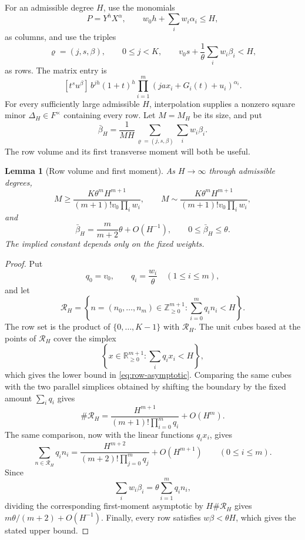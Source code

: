 \documentclass[11pt]{article}
\newcommand{\RR}{\mathbb R}
\newcommand{\NN}{\mathbb Z_{\ge 0}}
\newtheorem{lemma}[theorem]{Lemma}
\theoremstyle{definition}
\theoremstyle{remark}
\numberwithin{equation}{section}
\begin{document}
For an admissible degree $H$, use the monomials
\[
 P=Y^hX^\alpha,
 \qquad w_0h+\sum_iw_i\alpha_i\le H,
\]
as columns, and use the triples
\[
 \varrho=(j,s,\beta),\qquad
 0\le j<K,
 \qquad v_0s+\frac1\theta\sum_iw_i\beta_i<H,
\]
as rows.  The matrix entry is
\begin{equation}\label{eq:matrix-entry}
 [t^su^\beta]\,
 b^{jh}(1+t)^h
 \prod_{i=1}^m(ja x_i+G_i(t)+u_i)^{\alpha_i}.
\end{equation}
For every sufficiently large admissible $H$, interpolation supplies a
nonzero square minor $\Delta_H\in F^\times$ containing every row.  Let
$M=M_H$ be its size, and put
\begin{equation}\label{eq:bbar}
 \bar\beta_H=\frac1{MH}
 \sum_{\varrho=(j,s,\beta)}\sum_iw_i\beta_i.
\end{equation}
The row volume and its first transverse moment will both be useful.

\begin{lemma}[Row volume and first moment]\label{lem:row-moment}
As $H\to\infty$ through admissible degrees,
\begin{equation}\label{eq:row-asymptotic}
 M\ge
 \frac{K\theta^mH^{m+1}}
 {(m+1)!v_0\prod_iw_i},
 \qquad
 M\sim
 \frac{K\theta^mH^{m+1}}
 {(m+1)!v_0\prod_iw_i},
\end{equation}
and
\begin{equation}\label{eq:row-first-moment}
 \bar\beta_H=\frac{m}{m+2}\theta+O(H^{-1}),
 \qquad 0\le\bar\beta_H\le\theta.
\end{equation}
The implied constant depends only on the fixed weights.
\end{lemma}

\begin{proof}
Put
\[
 q_0=v_0,
 \qquad q_i=\frac{w_i}{\theta}\quad(1\le i\le m),
\]
and let
\[
 \mathcal R_H=
 \left\{n=(n_0,\ldots,n_m)\in\NN^{m+1}:
       \sum_{i=0}^m q_i n_i<H\right\}.
\]
The row set is the product of $\{0,\ldots,K-1\}$ with
$\mathcal R_H$.  The unit cubes based at the points of $\mathcal R_H$
cover the simplex
\[
 \left\{x\in\RR_{\ge0}^{m+1}:\sum_iq_ix_i<H\right\},
\]
which gives the lower bound in \eqref{eq:row-asymptotic}.  Comparing the
same cubes with the two parallel simplices obtained by shifting the
boundary by the fixed amount $\sum_iq_i$ gives
\[
 \#\mathcal R_H
 =\frac{H^{m+1}}{(m+1)!\prod_{i=0}^m q_i}+O(H^m).
\]
The same comparison, now with the linear functions $q_i x_i$, gives
\[
 \sum_{n\in\mathcal R_H}q_i n_i
 =\frac{H^{m+2}}{(m+2)!\prod_{j=0}^m q_j}+O(H^{m+1})
 \qquad(0\le i\le m).
\]
Since
\[
 \sum_iw_i\beta_i
 =\theta\sum_{i=1}^m q_i n_i,
\]
dividing the corresponding first-moment asymptotic by
$H\#\mathcal R_H$ gives
$m\theta/(m+2)+O(H^{-1})$.  Finally, every row satisfies
$w\beta<\theta H$, which gives the stated upper bound.
\end{proof}
\end{document}
